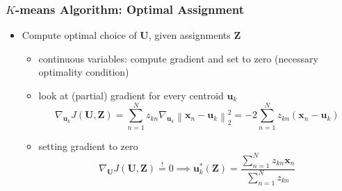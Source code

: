 \documentclass[conference,11pt]{IEEEtran}
\newcommand{\norm}[1]{\left\lVert#1\right\rVert}
\newcommand{\matr}[1]{\boldsymbol{\mathbf{#1}}}
\newcommand{\vect}[1]{\boldsymbol{\mathbf{#1}}}
\begin{document}
\subsubsection{$K$-means Algorithm: Optimal Assignment}
\begin{itemize}
  \item Compute optimal choice of $\matr{U}$, given assignments $\matr{Z}$
    \begin{itemize}
      \item continuous variables: compute gradient and set to zero (necessary
        optimality condition)
      \item look at (partial) gradient for every centroid $\vect{u}_k$
        \[
          \nabla_{\vect{u}_k} J(\matr{U},\matr{Z}) = \sum_{n=1}^N z_{kn}
          \nabla_{\vect{u}_k} \norm{\vect{x}_n - \vect{u}_k}_2^2 = -2
          \sum_{n=1}^N z_{kn} (\vect{x}_n - \vect{u}_k)
        \]
      \item setting gradient to zero
        \[
          \nabla_{\matr{U}} J(\matr{U},\matr{Z}) \stackrel{!}{=} 0 \implies
          \vect{u}_k^*(\matr{Z}) = \frac{\sum_{n=1}^N z_{kn} \vect{x}_n}
          {\sum_{n=1}^N z_{kn}} %
        \]
    \end{itemize}
\end{itemize}
\end{document}
